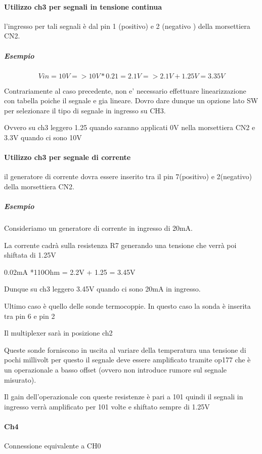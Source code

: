 \documentclass[12pt,a4paper]{report}
\begin{document}
\paragraph{Utilizzo ch3 per segnali in tensione continua}
l’ingresso per tali segnali è dal pin 1 (positivo) e 2 (negativo ) della morsettiera CN2.

\subparagraph{Esempio}

\[  
    Vin = 10V   
       => 10V * 0.21 = 2.1V
       => 2.1V + 1.25V = 3.35V
\]

Contrariamente al caso precedente, non e' necessario effettuare linearizzazione con tabella poiche il segnale e gia lineare.
Dovro dare dunque un opzione lato SW per selezionare il tipo di segnale in ingresso su CH3. 

Ovvero su ch3 leggero 1.25 quando saranno applicati 0V nella morsettiera CN2 e 3.3V quando ci sono 10V 

\paragraph{Utilizzo ch3 per segnale di corrente}
il generatore di corrente dovra essere inserito tra il pin 7(positivo) e 2(negativo) della morsettiera CN2.

\subparagraph{Esempio}

Consideriamo un generatore di corrente in ingresso di 20mA.

La corrente cadrà sulla resistenza R7 generando una tensione che verrà poi shiftata di 1.25V

0.02mA *110Ohm = 2.2V + 1.25 = 3.45V 

Dunque su ch3 leggero 3.45V quando ci sono 20mA in ingresso.

Ultimo caso è quello delle sonde termocoppie. In questo caso la sonda è inserita tra pin 6 e pin 2

Il multiplexer sarà in posizione ch2

Queste sonde forniscono in uscita al variare della temperatura una tensione di pochi millivolt per questo il segnale deve essere amplificato tramite op177 che è un operazionale a basso offset (ovvero non introduce rumore sul segnale misurato).

Il gain dell’operazionale con queste resistenze è pari a 101 quindi il segnali in ingresso verrà amplificato per 101 volte e shiftato sempre di 1.25V

\paragraph{Ch4}
Connessione equivalente a CH0 
\end{document}
